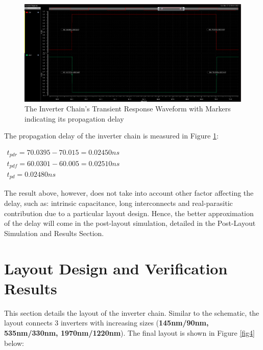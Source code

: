 \documentclass[letterpaper, 11pt]{article}
\begin{document}
\pagebreak
\begin{figure}[htb!]
	\centering
	\includegraphics[width=1.0\linewidth]{inv_chain_3_prop_delay.png}
	\caption{The Inverter Chain's Transient Response Waveform with Markers indicating its propagation delay}
	\label{fig3}
\end{figure}

The propagation delay of the inverter chain is measured in Figure \ref{fig3}:

\begin{math}\label{eq6}
\begin{array}{l}
t_{pdr} = 70.0395 - 70.015 = 0.02450ns\\
t_{pdf} = 60.0301 - 60.005 = 0.02510ns\\
t_{pd} = 0.02480ns
\end{array}
\end{math}

The result above, however, does not take into account other factor affecting the delay, such as: intrinsic capacitance, long interconnects and real-parasitic contribution due to a particular layout design. Hence, the better approximation of the delay will come in the post-layout simulation, detailed in the Post-Layout Simulation and Results Section.

\section{Layout Design and Verification Results}
\label{sec:layout_desg_and_verification}

This section details the layout of the inverter chain. Similar to the schematic, the layout connects 3 inverters with increasing sizes (\textbf{145nm/90nm, 535nm/330nm, 1970nm/1220nm}). The final layout is shown in Figure \ref{fig4} below:
\end{document}
